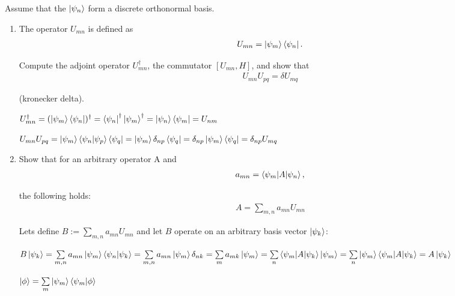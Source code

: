 \documentclass[11pt,a4paper]{scrartcl}
\begin{document}
    Assume that the $\ket{\psi_n}$ form a discrete orthonormal basis.
    \begin{enumerate}
        \item The operator $U_{mn}$ is defined as
        \begin{align*}
            U_{mn} = \ket{\psi_m} \bra{\psi_n}.
        \end{align*}

        Compute the adjoint operator $U^\dagger_{mn}$, the commutator $[U_{mn}, H]$, and show that 
        \begin{align*}
            U_{mn} U_{pq} = \delta U_{mq}
        \end{align*}

        (kronecker delta).

        \begin{calculationbox}
            \begin{calculationbox}
                $U^\dagger_{mn} = (\ket{\psi_m} \bra{\psi_n})^\dagger = \bra{\psi_n}^\dagger \ket{\psi_m}^\dagger = \ket{\psi_n} \bra{\psi_m} = U_{nm}$
            \end{calculationbox}

            \begin{calculationbox}
                $U_{mn} U_{pq} = \ket{\psi_m} \braket{\psi_n | \psi_p} \bra{\psi_q} = \ket{\psi_m} \delta_{np} \bra{\psi_q} = \delta_{np} \ket{\psi_m} \bra{\psi_q} = \delta_{np} U_{mq}$
            \end{calculationbox}
            
        \end{calculationbox}

        \item Show that for an arbitrary operator A and 
        \begin{align*}
            a_{mn} = \braket{\psi_m | A | \psi_n},
        \end{align*}

        the following holds:
        \begin{align*}
            A = \sum\limits_{m,n} a_{mn} U_{mn}
        \end{align*}

        \begin{calculationbox}
            Lets define $B := \sum\limits_{m,n} a_{mn} U_{mn}$ and let $B$ operate on an arbitrary basis vector $\ket{\psi_k}$:
            
            $B \ket{\psi_k} 
            = \sum\limits_{m,n} a_{mn} \ket{\psi_m} \braket{\psi_n | \psi_k} 
            = \sum\limits_{m,n} a_{mn} \ket{\psi_m} \delta_{nk} 
            = \sum\limits_m a_{mk} \ket{\psi_m} 
            = \sum\limits_n \braket{\psi_m | A | \psi_k} \ket{\psi_m}
            = \sum\limits_n \ket{\psi_m}\braket{\psi_m | A | \psi_k}
            = A \ket{\psi_k}$
            \begin{calculationbox}
                $\ket{\phi} = \sum\limits_m \ket{\psi_m} \braket{\psi_m |\phi}$
            \end{calculationbox}


\end{calculationbox}
\end{enumerate}
\end{document}
